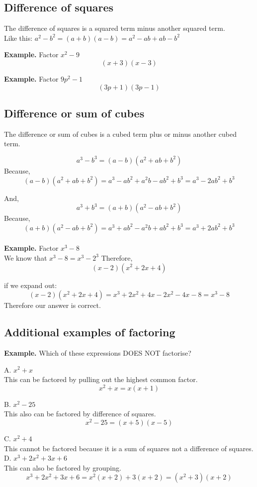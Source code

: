 \subsection{Difference of squares}
The difference of squares is a squared term minus another squared term.
\\ Like this: $a^2 - b^2 = (a+b)(a-b) = a^2-ab+ab-b^2 $ 

\textbf{Example.} Factor $x^2 - 9$ 
$$ (x+3)(x-3) $$


\textbf{Example.} Factor $9p^2 - 1$ 
$$ (3p+1)(3p-1) $$

\subsection{Difference or sum of cubes}
The difference or sum of cubes is a cubed term plus or minus another cubed term.

$$ a^3 - b^3 = (a-b)(a^2+ab+b^2) $$ Because, $$(a-b)(a^2+ab+b^2) = a^3 - ab^2 + a^2b - ab^2 + b^3 = a^3 - 2ab^2 + b^3 $$ 

And, 
$$ a^3 + b^3 = (a+b)(a^2-ab+b^2) $$ Because, $$(a+b)(a^2-ab+b^2) = a^3 + ab^2 - a^2b + ab^2 + b^3 = a^3 + 2ab^2 + b^3 $$ 
\\
\textbf{Example.} Factor $x^3 - 8$ \\
We know that $x^3 - 8 = x^3 - 2^3$
Therefore,
$$ (x-2)(x^2+2x+4) $$

if we expand out: 
$$ (x-2)(x^2+2x+4) = x^3 + 2x^2 + 4x - 2x^2 - 4x - 8 = x^3 - 8 $$
Therefore our answer is correct.

\subsection{Additional examples of factoring}
\textbf{Example.} Which of these expressions DOES NOT factorise?

A. $x^2 + x$ \\
This can be factored by pulling out the highest common factor. \\
$$ x^2 + x = x(x+1) $$

B. $x^2 - 25$ \\
This also can be factored by difference of squares. \\
$$ x^2 - 25 = (x+5)(x-5) $$

C. $x^2 + 4$ \\
This cannot be factored because it is a sum of squares not a difference of squares. \\

D. $x^3+2x^2+3x+6$ \\
This can also be factored by grouping. \\
$$ x^3+2x^2+3x+6 = x^2(x+2)+3(x+2) = (x^2+3)(x+2) $$

